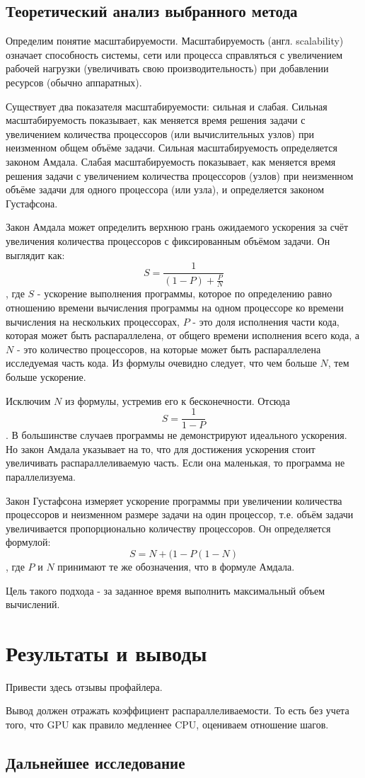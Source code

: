 \documentclass[a4paper,14pt,russian]{extreport}
\begin{document}
\section{Теоретический анализ выбранного метода}
Определим понятие масштабируемости. Масштабируемость (англ. scalability) означает способность системы, сети или процесса справляться с увеличением рабочей нагрузки (увеличивать свою производительность) при добавлении ресурсов (обычно аппаратных). 
\par
Существует два показателя масштабируемости: сильная и слабая. Сильная масштабируемость показывает, как меняется время решения задачи с увеличением количества процессоров (или вычислительных узлов) при неизменном общем объёме задачи. Сильная масштабируемость определяется законом Амдала. Слабая масштабируемость показывает, как меняется время решения задачи с увеличением количества процессоров (узлов) при неизменном объёме задачи для одного процессора (или узла), и определяется законом Густафсона.
\par
Закон Амдала может определить верхнюю грань ожидаемого ускорения за счёт увеличения количества процессоров с фиксированным объёмом задачи. Он выглядит как:
$$S=\frac{1}{\left(1-P\right)+\frac{P}{N}}$$, где $S$ - ускорение выполнения программы, которое по определению равно отношению времени вычисления программы на одном процессоре ко времени вычисления на нескольких процессорах, $P$ - это доля исполнения части кода, которая может быть распараллелена, от общего времени исполнения всего кода, а $N$ - это количество процессоров, на которые может быть распараллелена исследуемая часть кода. Из формулы очевидно следует, что чем больше $N$, тем больше ускорение.
\par 
Исключим $N$ из формулы, устремив его к бесконечности. Отсюда $$S = \frac{1}{1-P}$$. В большинстве случаев программы не демонстрируют идеального ускорения. Но закон Амдала указывает на то, что для достижения ускорения стоит увеличивать распараллеливаемую часть. Если она маленькая, то программа не параллелизуема.
\par
Закон Густафсона измеряет ускорение программы при увеличении количества процессоров и неизменном размере задачи на один процессор, т.е. объём задачи увеличивается пропорционально количеству процессоров. Он определяется формулой: $$S=N+(1-P(1-N)$$, где $P$ и $N$ принимают те же обозначения, что в формуле Амдала. 
\par
Цель такого подхода - за заданное время выполнить максимальный объем вычислений.
\par


\chapter{Результаты и выводы}
Привести здесь отзывы профайлера.
\par 
Вывод должен отражать коэффициент распараллеливаемости. То есть без учета того, что GPU как правило медленнее CPU, оцениваем отношение шагов. 

\section{Дальнейшее исследование}


 
\end{document}
